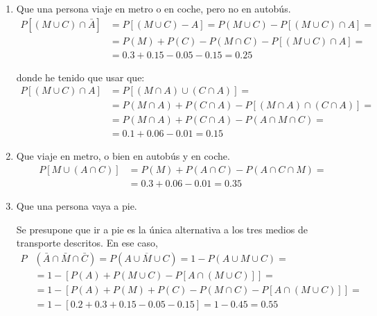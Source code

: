 \begin{ejercicio}
\begin{enumerate}
        \item Que una persona viaje en metro o en coche, pero no en autobús.
        \begin{equation*}\begin{split}
            P[(M\cup C) \cap \bar{A}]&= P[(M\cup C) - A] = P(M\cup C) - P[(M\cup C) \cap A] =\\&=
            P(M) + P(C) - P(M\cap C) - P[(M\cup C) \cap A] =
            \\&= 0.3 + 0.15 - 0.05 -0.15 = 0.25
        \end{split}\end{equation*}

        donde he tenido que usar que:
        \begin{equation*}\begin{split}
            P[(M\cup C) \cap A] &= P[(M\cap A) \cup (C\cap A)] =
            \\&=  P(M\cap A) + P(C\cap A) - P[(M\cap A) \cap (C\cap A)] =
            \\&=  P(M\cap A) + P(C\cap A) - P(A\cap M \cap C) =
            \\&= 0.1 + 0.06 - 0.01 = 0.15
        \end{split}\end{equation*}
        
        \item Que viaje en metro, o bien en autobús y en coche.
        \begin{equation*}
            \begin{split}
                P[M\cup (A\cap C)] &= P(M) + P(A\cap C) - P(A\cap C \cap M) =\\
                &= 0.3 + 0.06 - 0.01 = 0.35
            \end{split}
        \end{equation*}
        
        \item Que una persona vaya a pie.

        Se presupone que ir a pie es la única alternativa a los tres medios de transporte descritos. En ese caso,
        \begin{equation*}\begin{split}
            P&(\bar{A} \cap \bar{M} \cap \bar{C}) = P\left(\overline{A\cup M\cup C}\right) = 1-P(A\cup M\cup C) =\\
            &= 1-[P(A) + P(M\cup C) - P[A\cap (M\cup C)]] =\\
            &= 1-[P(A) + P(M) + P(C) - P(M\cap C) - P[A\cap (M\cup C)]] =\\
            &= 1-[0.2 + 0.3 + 0.15 - 0.05 - 0.15] = 1-0.45 = 0.55
        \end{split}\end{equation*}
    \end{enumerate}
\end{ejercicio}

